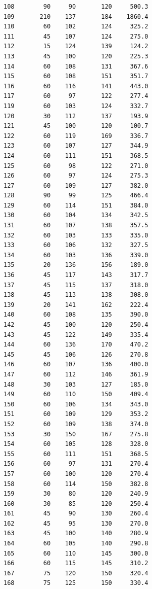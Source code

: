 \begin{code}
\begin{verbatim}
108        90     90       120     500.3
109       210    137       184    1860.4
110        60    102       124     325.2
111        45    107       124     275.0
112        15    124       139     124.2
113        45    100       120     225.3
114        60    108       131     367.6
115        60    108       151     351.7
116        60    116       141     443.0
117        60     97       122     277.4
119        60    103       124     332.7
120        30    112       137     193.9
121        45    100       120     100.7
122        60    119       169     336.7
123        60    107       127     344.9
124        60    111       151     368.5
125        60     98       122     271.0
126        60     97       124     275.3
127        60    109       127     382.0
128        90     99       125     466.4
129        60    114       151     384.0
130        60    104       134     342.5
131        60    107       138     357.5
132        60    103       133     335.0
133        60    106       132     327.5
134        60    103       136     339.0
135        20    136       156     189.0
136        45    117       143     317.7
137        45    115       137     318.0
138        45    113       138     308.0
139        20    141       162     222.4
140        60    108       135     390.0
142        45    100       120     250.4
143        45    122       149     335.4
144        60    136       170     470.2
145        45    106       126     270.8
146        60    107       136     400.0
147        60    112       146     361.9
148        30    103       127     185.0
149        60    110       150     409.4
150        60    106       134     343.0
151        60    109       129     353.2
152        60    109       138     374.0
153        30    150       167     275.8
154        60    105       128     328.0
155        60    111       151     368.5
156        60     97       131     270.4
157        60    100       120     270.4
158        60    114       150     382.8
159        30     80       120     240.9
160        30     85       120     250.4
161        45     90       130     260.4
162        45     95       130     270.0
163        45    100       140     280.9
164        60    105       140     290.8
165        60    110       145     300.0
166        60    115       145     310.2
167        75    120       150     320.4
168        75    125       150     330.4
\end{verbatim}

\begin{Shaded}
\begin{Highlighting}[]
\end{Highlighting}
\end{Shaded}


\end{code}
